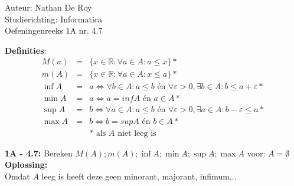 \documentclass[a4paper]{article}
\begin{document}
\noindent \large Auteur: Nathan De Roy \\
\noindent \large Studierichting: Informatica\\
\noindent \large Oefeningenreeks 1A nr. 4.7\\

\medskip

\normalsize

\textbf{Definities}:\\
\begin{eqnarray*}
    M(a) & = & \{x \in \mathbb{R} : \forall a \in A : a \leq x\} *\\
    m(A) & = & \{x \in \mathbb{R} : \forall a \in A : x \leq a\} *\\
    \inf A & = & a \Leftrightarrow \forall b \in A : a \leq b \text{ én } \forall \varepsilon > 0, \exists b \in A : b \leq a + \varepsilon *\\
    \min A & = & a \Leftrightarrow a = inf A \text{ én } a \in A *\\
    \sup A & = & b \Leftrightarrow \forall a \in A : a \leq b \text{ én } \forall \varepsilon > 0, \exists a \in A : b - \varepsilon \leq a *\\
    \max A & = & b \Leftrightarrow b = sup A \text{ én } b \in A *\\
    &&\text{* als $A$ niet leeg is} 
\end {eqnarray*}


\textbf{1A - 4.7:} Bereken $M(A); m(A); \inf A; \min A; \sup A; \max A$ voor: $A = \emptyset$\\

\textbf{Oplossing:}\\

Omdat $A$ leeg is heeft deze geen minorant, majorant, infimum,..\\

\begin{thebibliography}{999}
\end{thebibliography}
\end{document}
